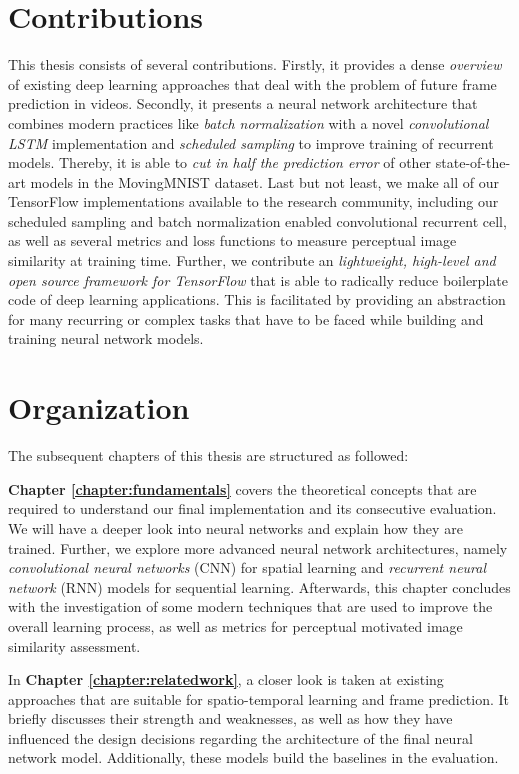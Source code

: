\section{Contributions}

This thesis consists of several contributions. Firstly, it provides a dense \textit{overview} of existing deep learning approaches that deal with the problem of future frame prediction in videos. Secondly, it presents a neural network architecture that combines modern practices like \textit{batch normalization} with a novel \textit{convolutional LSTM} implementation and \textit{scheduled sampling} to improve training of recurrent models. Thereby, it is able to \textit{cut in half the prediction error} of other state-of-the-art models in the MovingMNIST dataset. Last but not least, we make all of our TensorFlow implementations available to the research community, including our scheduled sampling and batch normalization enabled convolutional recurrent cell, as well as several metrics and loss functions to measure perceptual image similarity at training time. Further, we contribute an \textit{lightweight, high-level and open source framework for TensorFlow} that is able to radically reduce boilerplate code of deep learning applications. This is facilitated by providing an abstraction for many recurring or complex tasks that have to be faced while building and training neural network models.


\section{Organization}

The subsequent chapters of this thesis are structured as followed:

\textbf{Chapter \ref{chapter:fundamentals}} covers the theoretical concepts that are required to understand our final implementation and its consecutive evaluation. We will have a deeper look into neural networks and explain how they are trained. Further, we explore more advanced neural network architectures, namely \textit{convolutional neural networks} (CNN) for spatial learning and \textit{recurrent neural network} (RNN) models for sequential learning. Afterwards, this chapter concludes with the investigation of some modern techniques that are used to improve the overall learning process, as well as metrics for perceptual motivated image similarity assessment.

In \textbf{Chapter \ref{chapter:relatedwork}}, a closer look is taken at existing approaches that are suitable for spatio-temporal learning and frame prediction. It briefly discusses their strength and weaknesses, as well as how they have influenced the design decisions regarding the architecture of the final neural network model. Additionally, these models build the baselines in the evaluation.

